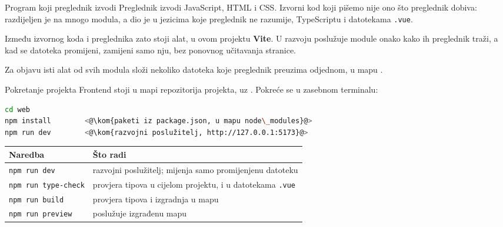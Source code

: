 
\begin{frame}{Program koji preglednik izvodi}
Preglednik izvodi JavaScript, HTML i CSS. Izvorni kod koji pišemo nije ono što preglednik dobiva: razdijeljen je na mnogo modula, a dio je u jezicima koje preglednik ne razumije, TypeScriptu i datotekama \texttt{.vue}.

\vspace{0.9em}
Između izvornog koda i preglednika zato stoji alat, u ovom projektu \textbf{Vite}. U razvoju poslužuje module onako kako ih preglednik traži, a kad se datoteka promijeni, zamijeni samo nju, bez ponovnog učitavanja stranice.

\vspace{0.9em}
Za objavu isti alat od svih modula složi nekoliko datoteka koje preglednik preuzima odjednom, u mapu .
\end{frame}

\begin{frame}[fragile]{Pokretanje projekta}
Frontend stoji u mapi  repozitorija projekta, uz . Pokreće se u zasebnom terminalu:

\begin{lstlisting}[language=bash]
cd web
npm install        <@\kom{paketi iz package.json, u mapu node\_modules}@>
npm run dev        <@\kom{razvojni poslužitelj, http://127.0.0.1:5173}@>
\end{lstlisting}

\vspace{0.4em}
\begin{center}
{\small
\setlength{\tabcolsep}{6pt}
\renewcommand{\arraystretch}{1.25}
\begin{tabular}{@{}L{3.9cm}L{7.9cm}@{}}
  \toprule
  \textbf{Naredba} & \textbf{Što radi} \\
  \midrule
  \texttt{npm run dev} & razvojni poslužitelj; mijenja samo promijenjenu datoteku \\
  \texttt{npm run type-check} & provjera tipova u cijelom projektu, i u datotekama \texttt{.vue} \\
  \texttt{npm run build} & provjera tipova i izgradnja u mapu  \\
  \texttt{npm run preview} & poslužuje izgrađenu mapu  \\
  \bottomrule
\end{tabular}
}
\end{center}
\end{frame}

